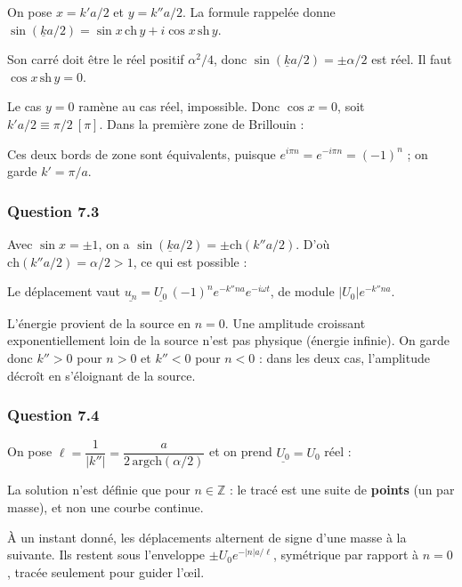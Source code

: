 \documentclass[11pt,a4paper]{article}
\newcommand{\equationajustee}[1]{%
  \sbox{\boiteequation}{$\displaystyle #1$}%
  \ifdim\wd\boiteequation>\linewidth
    \[\resizebox{\linewidth}{!}{\usebox{\boiteequation}}\]%
  \else
    \[#1\]%
  \fi}
\begin{document}
On pose \(x=k'a/2\) et \(y=k''a/2\). La formule rappelée donne \(\sin(\underline ka/2)=\sin x\,\mathrm{ch}\,y+i\cos x\,\mathrm{sh}\,y\).

Son carré doit être le réel positif \(\alpha^2/4\), donc \(\sin(\underline ka/2)=\pm\alpha/2\) est réel. Il faut \(\cos x\,\mathrm{sh}\,y=0\).

Le cas \(y=0\) ramène au cas réel, impossible. Donc \(\cos x=0\), soit \(k'a/2\equiv\pi/2\ [\pi]\). Dans la première zone de Brillouin :

\equationajustee{\boxed{k'=\pm\frac{\pi}{a}}}

Ces deux bords de zone sont équivalents, puisque \(e^{i\pi n}=e^{-i\pi n}=(-1)^n\) ; on garde \(k'=\pi/a\).

\hypertarget{question-7.3}{%
\subsubsection{Question 7.3}\label{question-7.3}}

Avec \(\sin x=\pm1\), on a \(\sin(\underline ka/2)=\pm\mathrm{ch}(k''a/2)\). D'où \(\mathrm{ch}(k''a/2)=\alpha/2>1\), ce qui est possible :

\equationajustee{\boxed{k''=\pm\frac{2}{a}\,\mathrm{argch}\frac{\alpha}{2}}}

Le déplacement vaut \(\underline{u_n}=\underline{U_0}\,(-1)^n e^{-k''na}e^{-i\omega t}\), de module \(\lvert U_0\rvert e^{-k''na}\).

L'énergie provient de la source en \(n=0\). Une amplitude croissant exponentiellement loin de la source n'est pas physique (énergie infinie). On garde donc \(k''>0\) pour \(n>0\) et \(k''<0\) pour \(n<0\) : dans les deux cas, l'amplitude décroît en s'éloignant de la source.

\hypertarget{question-7.4}{%
\subsubsection{Question 7.4}\label{question-7.4}}

On pose \(\ell=\dfrac{1}{\lvert k''\rvert}=\dfrac{a}{2\,\mathrm{argch}(\alpha/2)}\) et on prend \(\underline{U_0}=U_0\) réel :

\equationajustee{\boxed{u_n(t)=U_0\,(-1)^n\,e^{-|n|a/\ell}\cos\omega t}}

La solution n'est définie que pour \(n\in\mathbb Z\) : le tracé est une suite de \textbf{points} (un par masse), et non une courbe continue.

À un instant donné, les déplacements alternent de signe d'une masse à la suivante. Ils restent sous l'enveloppe \(\pm U_0e^{-|n|a/\ell}\), symétrique par rapport à \(n=0\), tracée seulement pour guider l'œil.
\end{document}
